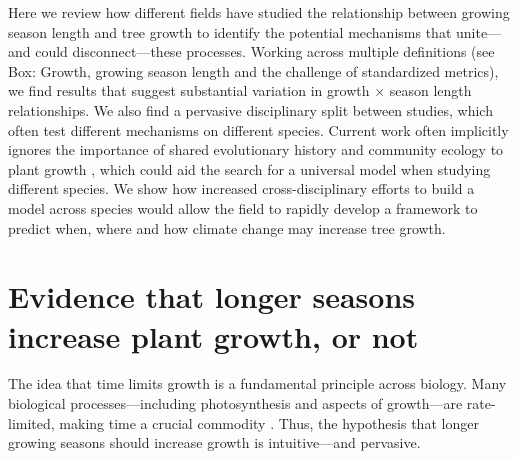 \documentclass[11pt]{article}
\newcommand{\R}[1]{\label{#1}\linelabel{#1}}
\begin{document}
Here we review how different fields have studied the relationship between growing season length and tree growth to identify the potential mechanisms that unite---and could disconnect---these processes. %
Working across multiple definitions (see Box: Growth, growing season length and the challenge of standardized metrics),\R{R1growth} we find results that suggest substantial variation in growth $\times$ season length relationships. We also find a pervasive disciplinary split between studies, which often test different mechanisms on different species. Current work often implicitly ignores the importance of shared evolutionary history and community ecology to plant growth \citep[e.g.][]{Grime:1977sw,Webb:2002or,avila2023evidence}, which could aid the search for a universal model when studying different species. We show how increased cross-disciplinary efforts to build a model across species would allow the field to rapidly develop a framework to predict when, where and how climate change may increase tree growth. %

\section*{Evidence that longer seasons increase plant growth, or not}
The idea that time limits growth is a fundamental principle across biology. Many biological processes---including photosynthesis and aspects of growth---are rate-limited, making time a crucial commodity \citep{nobel1983biophysical,cosgrove2005growth,hilty2021plant}. Thus, the hypothesis that longer growing seasons should increase growth is intuitive---and pervasive. 
\end{document}
